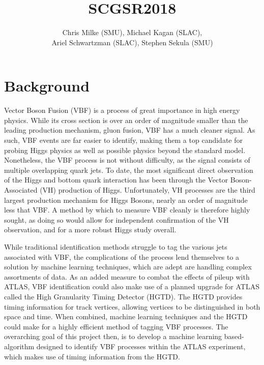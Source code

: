 \documentclass[12pt,letterpaper]{article}
\begin{document}
\pagestyle{fancy}


\pagestyle{plain}
\label{sec:coverpaqe}




\title{{\large SCGSR2018}}

\author{Chris Milke (SMU), Michael Kagan (SLAC),\\
  Ariel Schwartzman (SLAC), Stephen Sekula (SMU)}



\section*{Background}
    Vector Boson Fusion (VBF) is a process of great importance in high energy physics. While its cross section is over an order of magnitude smaller than the leading production mechanism, gluon fusion\cite{deFlorian:2016spz}, VBF has a much cleaner signal. As such, VBF events are far easier to identify, making them a top candidate for probing Higgs physics as well as possible physics beyond the standard model. Nonetheless, the VBF process is not without difficulty, as the signal consists of multiple overlapping quark jets. To date, the most significant direct observation of the Higgs and bottom quark interaction has been through the Vector Boson-Associated (VH) production of Higgs. Unfortunately, VH processes are the third largest production mechanism for Higgs Bosons, nearly an order of magnitude less that VBF. A method by which to measure VBF cleanly is therefore highly sought, as doing so would allow for independent confirmation of the VH observation, and for a more robust Higgs study overall.  
    
    While traditional identification methods struggle to tag the various jets associated with VBF, the complications of the process lend themselves to a solution by machine learning techniques, which are adept are handling complex assortments of data. As an added measure to combat the effects of pileup with ATLAS, VBF identification could also make use of a planned upgrade for ATLAS called the High Granularity Timing Detector (HGTD). The HGTD provides timing information for track vertices, allowing vertices to be distinguished in both space and time. When combined, machine learning techniques and the HGTD could make for a highly efficient method of tagging VBF processes. The overarching goal of this project then, is to develop a machine learning based-algorithm designed to identify VBF processes within the ATLAS experiment, which makes use of timing information from the HGTD.  
\end{document}
